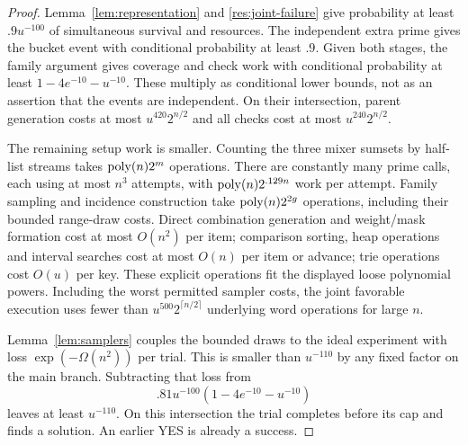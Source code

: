 \begin{proof}
Lemma~\ref{lem:representation} and \eqref{res:joint-failure} give
probability at least \(.9u^{-100}\) of simultaneous survival and
resources. The independent extra prime gives the bucket event with
conditional probability at least \(.9\). Given both stages, the
family argument gives coverage and check work with conditional
probability at least \(1-4e^{-10}-u^{-10}\). These multiply as
conditional lower bounds, not as an assertion that the events are
independent. On their intersection, parent generation costs at most
\(u^{420}2^{n/2}\) and all checks cost at most \(u^{240}2^{n/2}\).

The remaining setup work is smaller. Counting the three mixer
sumsets by half-list streams takes \(\operatorname{poly}(n)2^m\) operations.
There are constantly many prime calls, each using at most \(n^3\)
attempts, with \(\operatorname{poly}(n)2^{.129n}\) work per attempt. Family
sampling and incidence construction take \(\operatorname{poly}(n)2^{2g}\)
operations, including their bounded range-draw costs. Direct
combination generation and weight/mask formation cost at most
\(O(n^2)\) per item; comparison sorting, heap operations and interval
searches cost at most \(O(n)\) per item or advance; trie operations
cost \(O(u)\) per key. These explicit operations fit the displayed
loose polynomial powers. Including the worst permitted sampler costs,
the joint favorable execution uses fewer than
\(u^{500}2^{\lceil n/2\rceil}\) underlying word operations for large
\(n\).

Lemma~\ref{lem:samplers} couples the bounded draws to the ideal
experiment with loss \(\exp(-\Omega(n^2))\) per trial. This is
smaller than \(u^{-110}\) by any fixed factor on the main branch.
Subtracting that loss from
\[
 .81u^{-100}(1-4e^{-10}-u^{-10})
\]
leaves at least \(u^{-110}\). On this intersection the trial completes
before its cap and finds a solution. An earlier YES is already a
success.
\end{proof}
